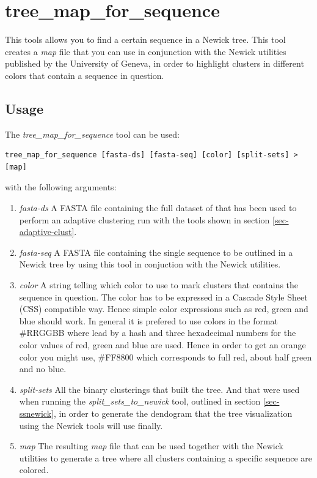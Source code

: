 \section{tree\_map\_for\_sequence} \label{sec-treemapseq}

This tools allows you to find a certain sequence in a Newick tree. This
tool creates a \emph{map} file that you can use in conjunction with the
Newick utilities \cite{newick_tools} published by the University of Geneva, in
order to highlight clusters in different colors that contain a
sequence in question.

\subsection{Usage}

The \emph{tree\_map\_for\_sequence} tool can be used:
\begin{lstlisting}
tree_map_for_sequence [fasta-ds] [fasta-seq] [color] [split-sets] > [map]
\end{lstlisting}
with the following arguments:
\begin{enumerate}
  \item \emph{fasta-ds} A FASTA file containing the full dataset of
    that has been used to perform an adaptive clustering run with the
    tools shown in section \ref{sec-adaptive-clust}.
  \item \emph{fasta-seq} A FASTA file containing the single sequence
    to be outlined in a Newick tree by using this tool in conjuction
    with the Newick utilities.
  \item \emph{color} A string telling which color to use to mark
    clusters that contains the sequence in question. The color has to
    be expressed in a Cascade Style Sheet (CSS) compatible way. Hence
    simple color expressions such as red, green and blue should
    work. In general it is prefered to use colors in the format
    \#RRGGBB where lead by a hash and three hexadecimal numbers for the
    color values of red, green and blue are used. Hence in order to
    get an orange color you might use, \#FF8800 which corresponds to
    full red, about half green and no blue. 
  \item \emph{split-sets} All the binary clusterings that built the
    tree. And that were used when running the
    \emph{split\_sets\_to\_newick} tool, outlined in section
    \ref{sec-ssnewick}, in order to generate the
    dendogram that the tree visualization using the Newick tools will
    use finally.
  \item \emph{map}
    The resulting \emph{map} file that can be used together with the
    Newick utilities to generate a tree where all clusters containing
    a specific sequence are colored.
\end{enumerate}

